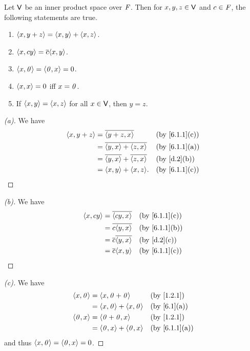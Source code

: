 \begin{thm}\label{6.1}
	Let \(\mathsf{V}\) be an inner product space over \(\mathit{F}\).
	Then for \(x, y, z \in \mathsf{V}\) and \(c \in \mathit{F}\), the following statements are true.
	\begin{enumerate}
		\item \(\left\langle x, y + z\right\rangle = \left\langle x, y\right\rangle + \left\langle x, z\right\rangle\).
		\item \(\inn{x, cy} = \conj{c} \inn{x, y}\).
		\item \(\left\langle x, \mathit{0}\right\rangle = \left\langle\mathit{0}, x\right\rangle = 0\).
		\item \(\left\langle x, x\right\rangle = 0\) iff \(x = \mathit{0}\).
		\item If \(\left\langle x, y\right\rangle = \left\langle x, z\right\rangle\) for all \(x \in \mathsf{V}\), then \(y = z\).
	\end{enumerate}
\end{thm}

\begin{proof}[(a)]
	We have
	\begin{align*}
		\inn{x, y + z} & = \conj{\inn{y + z, x}}                 &  & \by{6.1.1}[c] \\
		               & = \conj{\inn{y, x} + \inn{z, x}}        &  & \by{6.1.1}[a] \\
		               & = \conj{\inn{y, x}} + \conj{\inn{z, x}} &  & \by{d.2}[b]   \\
		               & = \inn{x, y} + \inn{x, z}.              &  & \by{6.1.1}[c]
	\end{align*}
\end{proof}

\begin{proof}[(b)]
	We have
	\begin{align*}
		\inn{x, cy} & = \conj{\inn{cy, x}}         &  & \by{6.1.1}[c] \\
		            & = \conj{c \inn{y, x}}        &  & \by{6.1.1}[b] \\
		            & = \conj{c} \conj{\inn{y, x}} &  & \by{d.2}[c]   \\
		            & = \conj{c} \inn{x, y}        &  & \by{6.1.1}[c]
	\end{align*}
\end{proof}

\begin{proof}[(c)]
	We have
	\begin{align*}
		\inn{x, \zv} & = \inn{x, \zv + \zv}          &  & \by{1.2.1}    \\
		             & = \inn{x, \zv} + \inn{x, \zv} &  & \by{6.1}[a]   \\
		\inn{\zv, x} & = \inn{\zv + \zv, x}          &  & \by{1.2.1}    \\
		             & = \inn{\zv, x} + \inn{\zv, x} &  & \by{6.1.1}[a]
	\end{align*}
	and thus \(\left\langle x, \mathit{0}\right\rangle = \left\langle\mathit{0}, x\right\rangle = 0\).
\end{proof}


